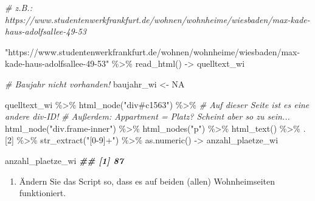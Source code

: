 \documentclass[
  ngerman,
]{article}
\newenvironment{Shaded}{\begin{snugshade}}{\end{snugshade}}
\newcommand{\CommentTok}[1]{\textcolor[rgb]{0.56,0.35,0.01}{\textit{#1}}}
\newcommand{\ConstantTok}[1]{\textcolor[rgb]{0.00,0.00,0.00}{#1}}
\newcommand{\DecValTok}[1]{\textcolor[rgb]{0.00,0.00,0.81}{#1}}
\newcommand{\DocumentationTok}[1]{\textcolor[rgb]{0.56,0.35,0.01}{\textbf{\textit{#1}}}}
\newcommand{\FunctionTok}[1]{\textcolor[rgb]{0.00,0.00,0.00}{#1}}
\newcommand{\NormalTok}[1]{#1}
\newcommand{\OtherTok}[1]{\textcolor[rgb]{0.56,0.35,0.01}{#1}}
\newcommand{\SpecialCharTok}[1]{\textcolor[rgb]{0.00,0.00,0.00}{#1}}
\newcommand{\StringTok}[1]{\textcolor[rgb]{0.31,0.60,0.02}{#1}}
\providecommand{\tightlist}{%
  \setlength{\itemsep}{0pt}\setlength{\parskip}{0pt}}
\begin{document}
\begin{Shaded}
\begin{Highlighting}[]
\CommentTok{\# z.B.: https://www.studentenwerkfrankfurt.de/wohnen/wohnheime/wiesbaden/max{-}kade{-}haus{-}adolfsallee{-}49{-}53}

\StringTok{"https://www.studentenwerkfrankfurt.de/wohnen/wohnheime/wiesbaden/max{-}kade{-}haus{-}adolfsallee{-}49{-}53"} \SpecialCharTok{\%\textgreater{}\%}
  \FunctionTok{read\_html}\NormalTok{() }\OtherTok{{-}\textgreater{}}\NormalTok{ quelltext\_wi}

\CommentTok{\# Baujahr nicht vorhanden!}
\NormalTok{baujahr\_wi }\OtherTok{\textless{}{-}} \ConstantTok{NA}

\NormalTok{quelltext\_wi }\SpecialCharTok{\%\textgreater{}\%}
  \FunctionTok{html\_node}\NormalTok{(}\StringTok{"div\#c1563"}\NormalTok{) }\SpecialCharTok{\%\textgreater{}\%}
  \CommentTok{\# Auf dieser Seite ist es eine andere div{-}ID!}
  \CommentTok{\# Außerdem: Appartment = Platz? Scheint aber so zu sein...}
  \FunctionTok{html\_node}\NormalTok{(}\StringTok{"div.frame{-}inner"}\NormalTok{) }\SpecialCharTok{\%\textgreater{}\%}
  \FunctionTok{html\_nodes}\NormalTok{(}\StringTok{"p"}\NormalTok{) }\SpecialCharTok{\%\textgreater{}\%}
  \FunctionTok{html\_text}\NormalTok{() }\SpecialCharTok{\%\textgreater{}\%}
\NormalTok{  .[}\DecValTok{2}\NormalTok{] }\SpecialCharTok{\%\textgreater{}\%}
  \FunctionTok{str\_extract}\NormalTok{(}\StringTok{"[0{-}9]+"}\NormalTok{) }\SpecialCharTok{\%\textgreater{}\%}
  \FunctionTok{as.numeric}\NormalTok{() }\OtherTok{{-}\textgreater{}}\NormalTok{ anzahl\_plaetze\_wi}

\NormalTok{anzahl\_plaetze\_wi}
\DocumentationTok{\#\# [1] 87}
\end{Highlighting}
\end{Shaded}

\begin{enumerate}
\def\labelenumi{\arabic{enumi}.}
\setcounter{enumi}{2}
\tightlist
\item
  Ändern Sie das Script so, dass es auf beiden (allen) Wohnheimseiten funktioniert.
\end{enumerate}
\end{document}
